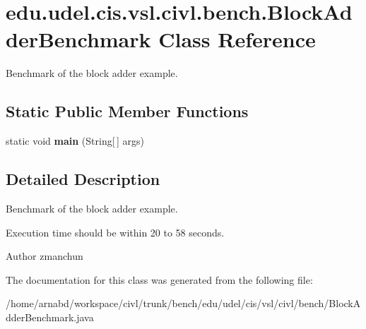 \hypertarget{classedu_1_1udel_1_1cis_1_1vsl_1_1civl_1_1bench_1_1BlockAdderBenchmark}{}\section{edu.\+udel.\+cis.\+vsl.\+civl.\+bench.\+Block\+Adder\+Benchmark Class Reference}
\label{classedu_1_1udel_1_1cis_1_1vsl_1_1civl_1_1bench_1_1BlockAdderBenchmark}


Benchmark of the block adder example.  


\subsection*{Static Public Member Functions}
\begin{DoxyCompactItemize}
\item 
\hypertarget{classedu_1_1udel_1_1cis_1_1vsl_1_1civl_1_1bench_1_1BlockAdderBenchmark_aaf86c571fe683547381d70aa040fe6f4}{}static void {\bfseries main} (String\mbox{[}$\,$\mbox{]} args)\label{classedu_1_1udel_1_1cis_1_1vsl_1_1civl_1_1bench_1_1BlockAdderBenchmark_aaf86c571fe683547381d70aa040fe6f4}

\end{DoxyCompactItemize}


\subsection{Detailed Description}
Benchmark of the block adder example. 

Execution time should be within 20 to 58 seconds.

\begin{DoxyAuthor}{Author}
zmanchun 
\end{DoxyAuthor}


The documentation for this class was generated from the following file\+:\begin{DoxyCompactItemize}
\item 
/home/arnabd/workspace/civl/trunk/bench/edu/udel/cis/vsl/civl/bench/Block\+Adder\+Benchmark.\+java\end{DoxyCompactItemize}
